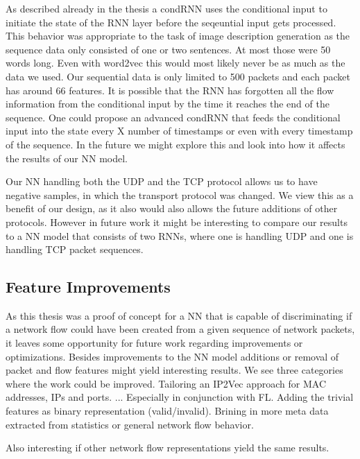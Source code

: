 \documentclass[
	ngerman,
	ruledheaders=section,%
	class=report,%
	thesis={type=bachelor},%
	accentcolor=9c,%
	custommargins=true,%
	marginpar=false,%
	parskip=half-,%
	fontsize=11pt,%
]{tudapub}
\begin{document}
As described already in the thesis a condRNN uses the conditional input to initiate the state of the RNN layer before the seqeuntial input gets processed.
This behavior was appropriate to the task of image description generation \cite{vinyalsShowTellNeural2015} \cite{karpathyDeepVisualSemanticAlignments2015} as the sequence data only consisted of one or two sentences.
At most those were 50 words long.
Even with word2vec this would most likely never be as much as the data we used.
Our sequential data is only limited to 500 packets and each packet has around 66 features.
It is possible that the RNN has forgotten all the flow information from the conditional input by the time it reaches the end of the sequence.
One could propose an advanced condRNN that feeds the conditional input into the state every X number of timestamps or even with every timestamp of the sequence.
In the future we might explore this and look into how it affects the results of our NN model.

Our NN handling both the UDP and the TCP protocol allows us to have negative samples, in which the transport protocol was changed.
We view this as a benefit of our design, as it also would also allows the future additions of other protocols.
However in future work it might be interesting to compare our results to a NN model that consists of two RNNs, where one is handling UDP and one is handling TCP packet sequences.

\subsection{Feature Improvements}
\label{sec:featureImprovements}

As this thesis was a proof of concept for a NN that is capable of discriminating if a network flow could have been created from a given sequence of network packets, it leaves some opportunity for future work regarding improvements or optimizations.
Besides improvements to the NN model additions or removal of packet and flow features might yield interesting results.
We see three categories where the work could be improved.
Tailoring an IP2Vec approach for MAC addresses, IPs and ports. ...
Especially in conjunction with FL.
Adding the trivial features as binary representation (valid/invalid).
Brining in more meta data extracted from statistics or general network flow behavior.

Also interesting if other network flow representations yield the same results.


\printbibliography
\end{document}
